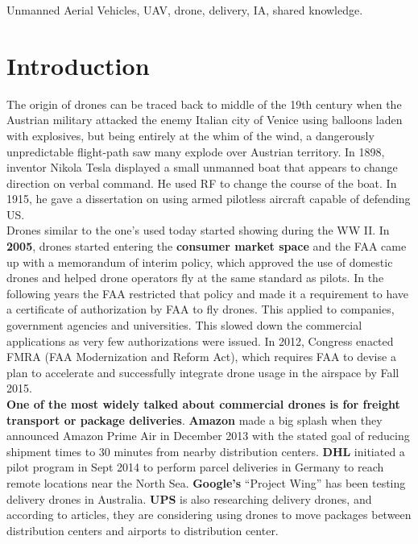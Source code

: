 \documentclass[conference]{IEEEtran}
\begin{document}

\begin{IEEEkeywords}
Unmanned Aerial Vehicles, UAV, drone, delivery, IA, shared knowledge.
\end{IEEEkeywords}


%
\IEEEpeerreviewmaketitle


\section{Introduction}


The origin of drones can be traced back to middle of the 19th century when the Austrian military attacked the enemy Italian city of Venice using balloons laden with explosives, but being entirely at the whim of the wind, a dangerously unpredictable flight-path saw many explode over Austrian territory. In 1898, inventor Nikola Tesla displayed a small unmanned boat that appears to change direction on verbal command. He used RF to change the course of the boat. In 1915, he gave a dissertation on using armed pilotless aircraft capable of defending US.\\

Drones similar to the one’s used today started showing during the WW II.
In \textbf{2005}, drones started entering the \textbf{consumer market space} and the FAA came up with a memorandum of interim policy, which approved the use of domestic drones and helped drone operators fly at the same standard as pilots.
In the following years the FAA restricted that policy and made it a requirement to have a certificate of authorization by FAA to fly drones. This applied to companies, government 
agencies and universities. This slowed down the commercial applications as very few
authorizations were issued. In 2012, Congress enacted FMRA (FAA Modernization and Reform Act), which requires FAA to devise a plan to accelerate and successfully integrate drone usage in the airspace by Fall 2015.\\

\textbf{One of the most widely talked about commercial drones is for freight transport or package deliveries}. \textbf{Amazon} made a big splash when they announced Amazon Prime Air in December 2013 with the stated goal of reducing shipment times to 30 minutes from nearby distribution centers. \textbf{DHL} initiated a pilot program in Sept 2014 to perform parcel deliveries in Germany to reach remote locations near the North Sea. \textbf{Google's} ``Project Wing'' has been testing delivery drones in Australia. \textbf{UPS} is also researching delivery drones, and according to articles, they are considering using drones to move packages between distribution centers and airports to distribution center.\\
\end{document}
